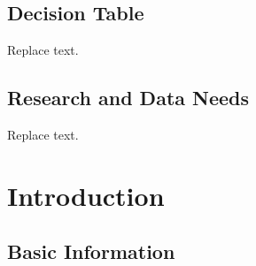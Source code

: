 \documentclass[11pt,
  english,
  a4paper,
]{article}
\begin{document}
\leavevmode\tagmcend\tagstructend\par


\hypertarget{decision-table}{%
\subsection*{Decision Table}\label{decision-table}}

\leavevmode\tagmcend\tagstructend


Replace text.

\leavevmode\tagmcend\tagstructend\par


\hypertarget{research-and-data-needs}{%
\subsection*{Research and Data Needs}\label{research-and-data-needs}}

\leavevmode\tagmcend\tagstructend


Replace text.

\leavevmode\tagmcend\tagstructend\par

\pagebreak
\setlength{\parskip}{5mm plus1mm minus1mm}
\setcounter{page}{1}
\renewcommand{\thefigure}{\arabic{figure}}
\renewcommand{\thetable}{\arabic{table}}
\setcounter{table}{0}
\setcounter{figure}{0}


\hypertarget{introduction}{%
\section{Introduction}\label{introduction}}

\leavevmode\tagmcend\tagstructend


\hypertarget{basic-information}{%
\subsection{Basic Information}\label{basic-information}}
\end{document}
